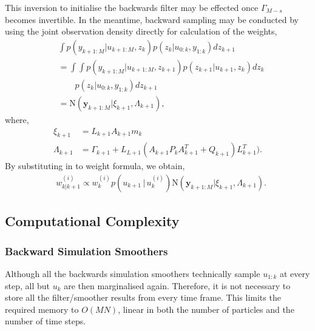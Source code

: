 \documentclass[twocolumn]{autart}    %
\begin{document}
This inversion to initialise the backwards filter may be effected once $\Gamma_{M-s}$ becomes invertible. In the meantime, backward sampling may be conducted by using the joint observation density directly for calculation of the weights,
%
\begin{equation}
\begin{split}
  &\int p(y_{k+1:M} | u_{k+1:M}, z_k) p(z_k | u_{0:k}, y_{1:k}) dz_{k+1} \\
  &= \int \int p(y_{k+1:M} | u_{k+1:M}, z_{k+1}) p(z_{k+1} | u_{k+1}, z_{k}) dz_k\\
  & \qquad p(z_k | u_{0:k}, y_{1:k}) dz_{k+1} \\
  &= \mathrm{N}( \mathbf{y}_{k+1:M} | \xi_{k+1} , \Lambda_{k+1} )     ,
\end{split}
\end{equation}
%
where,
%
\begin{equation}
\begin{split}
  \xi_{k+1} &= L_{k+1} A_{k+1} m_k \\
  \Lambda_{k+1} &= \Gamma_{k+1} + L_{L+1} ( A_{k+1} P_k A_{k+1}^T + Q_{k+1} ) L_{k+1}^T )     .
\end{split}
\end{equation}
%
By substituting in to weight formula, we obtain,
%
\begin{equation}
\begin{split}
  &w_{k|k+1}^{(i)} \propto w^{(i)}_k p(u_{k+1}\,|\,u_{k}^{(i)}) \mathrm{N}( \mathbf{y}_{k+1:M} | \xi_{k+1} , \Lambda_{k+1} )     .
\end{split}
\end{equation}



\subsection{Computational Complexity}

\subsubsection{Backward Simulation Smoothers}

Although all the backwards simulation smoothers technically sample $u_{1:k}$ at every step, all but $u_k$ are then marginalised again. Therefore, it is not necessary to store all the filter/smoother results from every time frame. This limits the required memory to $O(MN)$, linear in both the number of particles and the number of time steps.
\end{document}
